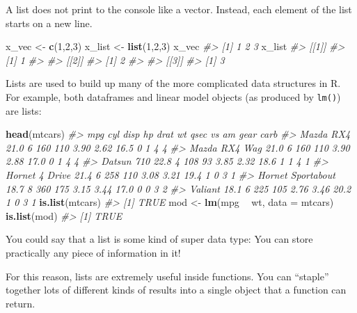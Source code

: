 \documentclass[
]{book}
\newenvironment{Shaded}{\begin{snugshade}}{\end{snugshade}}
\newcommand{\CommentTok}[1]{\textcolor[rgb]{0.56,0.35,0.01}{\textit{#1}}}
\newcommand{\DataTypeTok}[1]{\textcolor[rgb]{0.13,0.29,0.53}{#1}}
\newcommand{\DecValTok}[1]{\textcolor[rgb]{0.00,0.00,0.81}{#1}}
\newcommand{\KeywordTok}[1]{\textcolor[rgb]{0.13,0.29,0.53}{\textbf{#1}}}
\newcommand{\NormalTok}[1]{#1}
\newcommand{\OperatorTok}[1]{\textcolor[rgb]{0.81,0.36,0.00}{\textbf{#1}}}
\newcommand{\StringTok}[1]{\textcolor[rgb]{0.31,0.60,0.02}{#1}}
\begin{document}
A list does not print to the console like a vector. Instead, each element of the list starts on a new line.

\begin{Shaded}
\begin{Highlighting}[]
\NormalTok{x_vec <-}\StringTok{ }\KeywordTok{c}\NormalTok{(}\DecValTok{1}\NormalTok{,}\DecValTok{2}\NormalTok{,}\DecValTok{3}\NormalTok{)}
\NormalTok{x_list <-}\StringTok{ }\KeywordTok{list}\NormalTok{(}\DecValTok{1}\NormalTok{,}\DecValTok{2}\NormalTok{,}\DecValTok{3}\NormalTok{)}
\NormalTok{x_vec}
\CommentTok{#> [1] 1 2 3}
\NormalTok{x_list}
\CommentTok{#> [[1]]}
\CommentTok{#> [1] 1}
\CommentTok{#> }
\CommentTok{#> [[2]]}
\CommentTok{#> [1] 2}
\CommentTok{#> }
\CommentTok{#> [[3]]}
\CommentTok{#> [1] 3}
\end{Highlighting}
\end{Shaded}

Lists are used to build up many of the more complicated data structures in R. For example, both dataframes and linear model objects (as produced by \texttt{lm()}) are lists:

\begin{Shaded}
\begin{Highlighting}[]
\KeywordTok{head}\NormalTok{(mtcars)}
\CommentTok{#>                    mpg cyl disp  hp drat   wt qsec vs am gear carb}
\CommentTok{#> Mazda RX4         21.0   6  160 110 3.90 2.62 16.5  0  1    4    4}
\CommentTok{#> Mazda RX4 Wag     21.0   6  160 110 3.90 2.88 17.0  0  1    4    4}
\CommentTok{#> Datsun 710        22.8   4  108  93 3.85 2.32 18.6  1  1    4    1}
\CommentTok{#> Hornet 4 Drive    21.4   6  258 110 3.08 3.21 19.4  1  0    3    1}
\CommentTok{#> Hornet Sportabout 18.7   8  360 175 3.15 3.44 17.0  0  0    3    2}
\CommentTok{#> Valiant           18.1   6  225 105 2.76 3.46 20.2  1  0    3    1}
\KeywordTok{is.list}\NormalTok{(mtcars)}
\CommentTok{#> [1] TRUE}
\NormalTok{mod <-}\StringTok{ }\KeywordTok{lm}\NormalTok{(mpg }\OperatorTok{~}\StringTok{ }\NormalTok{wt, }\DataTypeTok{data =}\NormalTok{ mtcars)}
\KeywordTok{is.list}\NormalTok{(mod)}
\CommentTok{#> [1] TRUE}
\end{Highlighting}
\end{Shaded}

You could say that a list is some kind of super data type: You can store practically any piece of information in it!

For this reason, lists are extremely useful inside functions. You can ``staple'' together lots of different kinds of results into a single object that a function can return.
\end{document}
